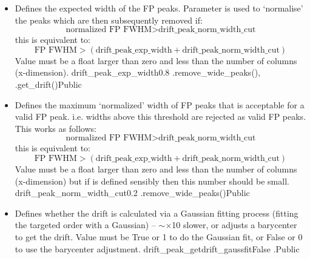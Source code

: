 \begin{itemize}
\item {} 
{Defines the expected width of the FP peaks. Parameter is used to `normalise' the peaks which are then subsequently removed if:
\begin{equation}
\text{normalized FP FWHM} > \text{drift\_peak\_norm\_width\_cut}
\end{equation}
this is equivalent to:
\begin{equation}
\text{FP FWHM} > (\text{drift\_peak\_exp\_width} + \text{drift\_peak\_norm\_width\_cut})
\end{equation}
Value must be a float larger than zero and less than the number of columns (x-dimension).
}
{drift\_peak\_exp\_width}{0.8}
{\calDRIFTPEAK}{\constantsfile}{\spirouRV.remove\_wide\_peaks(), \spirouRV.get\_drift()}{Public}

\item {}
{Defines the maximum `normalized' width of FP peaks that is acceptable for a valid FP peak. i.e. widths above this threshold are rejected as valid FP peaks.
This works as follows:
\begin{equation}
\text{normalized FP FWHM} > \text{drift\_peak\_norm\_width\_cut}
\end{equation}
this is equivalent to:
\begin{equation}
\text{FP FWHM} > (\text{drift\_peak\_exp\_width} + \text{drift\_peak\_norm\_width\_cut})
\end{equation}
Value must be a float larger than zero and less than the number of columns (x-dimension) but if  is defined sensibly then this number should be small.
}
{drift\_peak\_norm\_width\_cut}{0.2}
{\calDRIFTPEAK}{\constantsfile}{\spirouRV.remove\_wide\_peaks()}{Public}

\item {}
{Defines whether the drift is calculated via a Gaussian fitting process (fitting the targeted order with a Gaussian) -- $\sim\times$10 slower, or adjusts a barycenter to get the drift. Value must be True or 1 to do the Gaussian fit, or False or 0 to use the barycenter adjustment.}
{drift\_peak\_getdrift\_gaussfit}{False}
{\calDRIFTPEAK}{\constantsfile}{\calDRIFTPEAK.\progMAIN}{Public}


\end{itemize}
